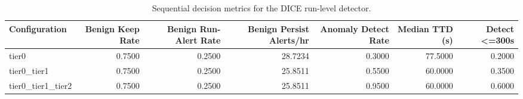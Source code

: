 \begin{table}[t]
\centering
\caption{Sequential decision metrics for the DICE run-level detector.}
\label{tab:dice_sequential_metrics}
\footnotesize
\begin{tabular}{lrrrrrr}
\toprule
Configuration & Benign Keep Rate & Benign Run-Alert Rate & Benign Persist Alerts/hr & Anomaly Detect Rate & Median TTD (s) & Detect <=300s \\
\midrule
tier0 & 0.7500 & 0.2500 & 28.7234 & 0.3000 & 77.5000 & 0.2000 \\
tier0_tier1 & 0.7500 & 0.2500 & 25.8511 & 0.5500 & 60.0000 & 0.3500 \\
tier0_tier1_tier2 & 0.7500 & 0.2500 & 25.8511 & 0.9500 & 60.0000 & 0.6000 \\
\bottomrule
\end{tabular}

\end{table}

